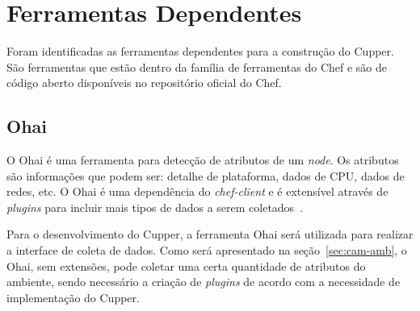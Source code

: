 \section{Ferramentas Dependentes}

Foram identificadas as ferramentas dependentes para a construção do Cupper.
São ferramentas que estão dentro da família de ferramentas do Chef e são
de código aberto disponíveis no repositório oficial do Chef.

\subsection{Ohai}

O Ohai é uma ferramenta para detecção de atributos de um \textit{node}. Os atributos são
informações que podem ser: detalhe de plataforma, dados de CPU, dados de redes, etc.
O Ohai é uma dependência do \textit{chef-client} e é extensível através de \textit{plugins}
para incluir mais tipos de dados a serem coletados~\cite{ohaidoc:2016}.

Para o desenvolvimento do Cupper, a ferramenta Ohai será utilizada para realizar a
interface de coleta de dados. Como será apresentado na seção~\ref{sec:cam-amb}, o
Ohai, sem extensões, pode coletar uma certa quantidade de atributos do ambiente, sendo
necessário a criação de \textit{plugins} de acordo com a necessidade de implementação do Cupper.

